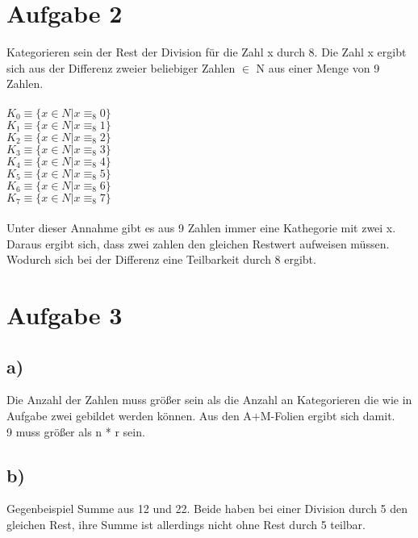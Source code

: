 \documentclass{article}
\begin{document}
	\section*{Aufgabe 2}
	Kategorieren sein der Rest der Division  für die Zahl x durch 8. Die Zahl x ergibt sich aus der Differenz zweier beliebiger Zahlen $\in$ N aus einer Menge von 9 Zahlen. \\ \\
	$K_0 \equiv \{x \in N | x \equiv_8 0\}$ \\
	$K_1 \equiv \{x \in N | x \equiv_8 1\}$ \\
	$K_2 \equiv \{x \in N | x \equiv_8 2\}$ \\
	$K_3 \equiv \{x \in N | x \equiv_8 3\}$ \\
	$K_4 \equiv \{x \in N | x \equiv_8 4\}$ \\
	$K_5 \equiv \{x \in N | x \equiv_8 5\}$ \\
	$K_6 \equiv \{x \in N | x \equiv_8 6\}$ \\
	$K_7 \equiv \{x \in N | x \equiv_8 7\}$ \\
	\\
	Unter dieser Annahme gibt es aus 9 Zahlen immer eine Kathegorie mit zwei x. \\
	Daraus ergibt sich, dass zwei zahlen den gleichen Restwert aufweisen müssen. Wodurch sich bei der Differenz eine Teilbarkeit durch 8 ergibt.
	\section*{Aufgabe 3}
	\subsection*{a)}
	Die Anzahl der Zahlen muss größer sein als die Anzahl an Kategorieren die wie in Aufgabe zwei gebildet werden können. Aus den A+M-Folien ergibt sich damit. \\
	9 muss größer als n * r sein.
	\subsection*{b)}
	Gegenbeispiel Summe aus 12 und 22. Beide haben bei einer Division durch 5 den gleichen Rest, ihre Summe ist allerdings nicht ohne Rest durch 5 teilbar.
\end{document}
